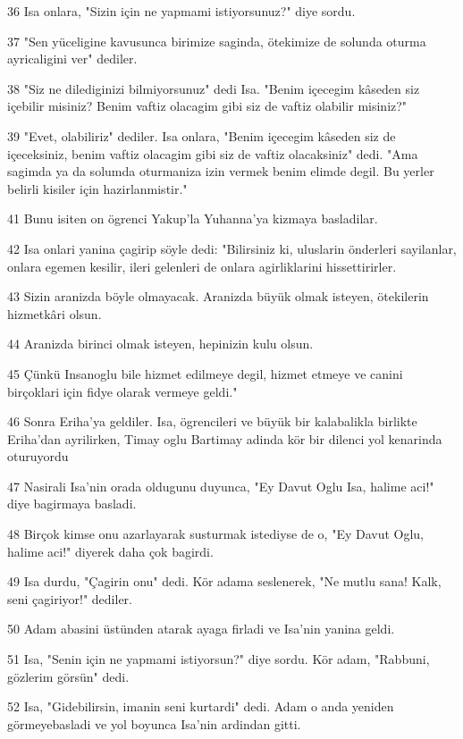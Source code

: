\par 36 Isa onlara, "Sizin için ne yapmami istiyorsunuz?" diye sordu.
\par 37 "Sen yüceligine kavusunca birimize saginda, ötekimize de solunda oturma ayricaligini ver" dediler.
\par 38 "Siz ne dilediginizi bilmiyorsunuz" dedi Isa. "Benim içecegim kâseden siz içebilir misiniz? Benim vaftiz olacagim gibi siz de vaftiz olabilir misiniz?"
\par 39 "Evet, olabiliriz" dediler. Isa onlara, "Benim içecegim kâseden siz de içeceksiniz, benim vaftiz olacagim gibi siz de vaftiz olacaksiniz" dedi. "Ama sagimda ya da solumda oturmaniza izin vermek benim elimde degil. Bu yerler belirli kisiler için hazirlanmistir."
\par 41 Bunu isiten on ögrenci Yakup'la Yuhanna'ya kizmaya basladilar.
\par 42 Isa onlari yanina çagirip söyle dedi: "Bilirsiniz ki, uluslarin önderleri sayilanlar, onlara egemen kesilir, ileri gelenleri de onlara agirliklarini hissettirirler.
\par 43 Sizin aranizda böyle olmayacak. Aranizda büyük olmak isteyen, ötekilerin hizmetkâri olsun.
\par 44 Aranizda birinci olmak isteyen, hepinizin kulu olsun.
\par 45 Çünkü Insanoglu bile hizmet edilmeye degil, hizmet etmeye ve canini birçoklari için fidye olarak vermeye geldi."
\par 46 Sonra Eriha'ya geldiler. Isa, ögrencileri ve büyük bir kalabalikla birlikte Eriha'dan ayrilirken, Timay oglu Bartimay adinda kör bir dilenci yol kenarinda oturuyordu
\par 47 Nasirali Isa'nin orada oldugunu duyunca, "Ey Davut Oglu Isa, halime aci!" diye bagirmaya basladi.
\par 48 Birçok kimse onu azarlayarak susturmak istediyse de o, "Ey Davut Oglu, halime aci!" diyerek daha çok bagirdi.
\par 49 Isa durdu, "Çagirin onu" dedi. Kör adama seslenerek, "Ne mutlu sana! Kalk, seni çagiriyor!" dediler.
\par 50 Adam abasini üstünden atarak ayaga firladi ve Isa'nin yanina geldi.
\par 51 Isa, "Senin için ne yapmami istiyorsun?" diye sordu. Kör adam, "Rabbuni, gözlerim görsün" dedi.
\par 52 Isa, "Gidebilirsin, imanin seni kurtardi" dedi. Adam o anda yeniden görmeyebasladi ve yol boyunca Isa'nin ardindan gitti.

